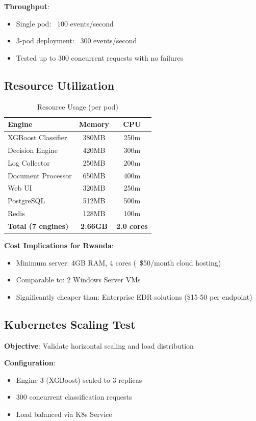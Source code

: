 \documentclass[11pt,conference]{IEEEtran}
\begin{document}
\textbf{Throughput}:
\begin{itemize}
    \item Single pod: ~100 events/second
    \item 3-pod deployment: ~300 events/second
    \item Tested up to 300 concurrent requests with no failures
\end{itemize}

\subsection{Resource Utilization}

\begin{table}[h]
\centering
\caption{Resource Usage (per pod)}
\begin{tabular}{lcc}
\toprule
\textbf{Engine} & \textbf{Memory} & \textbf{CPU} \\
\midrule
XGBoost Classifier & 380MB & 250m \\
Decision Engine & 420MB & 300m \\
Log Collector & 250MB & 200m \\
Document Processor & 650MB & 400m \\
Web UI & 320MB & 250m \\
PostgreSQL & 512MB & 500m \\
Redis & 128MB & 100m \\
\midrule
\textbf{Total (7 engines)} & \textbf{2.66GB} & \textbf{2.0 cores} \\
\bottomrule
\end{tabular}
\end{table}

\textbf{Cost Implications for Rwanda}:
\begin{itemize}
    \item Minimum server: 4GB RAM, 4 cores (~\$50/month cloud hosting)
    \item Comparable to: 2 Windows Server VMs
    \item Significantly cheaper than: Enterprise EDR solutions (\$15-50 per endpoint)
\end{itemize}

\subsection{Kubernetes Scaling Test}

\textbf{Objective}: Validate horizontal scaling and load distribution

\textbf{Configuration}:
\begin{itemize}
    \item Engine 3 (XGBoost) scaled to 3 replicas
    \item 300 concurrent classification requests
    \item Load balanced via K8s Service
\end{itemize}
\end{document}
